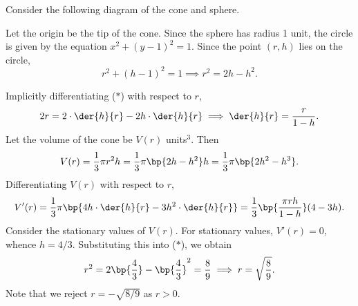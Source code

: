 \begin{solution}
    Consider the following diagram of the cone and sphere.

    \begin{center}
    \end{center}

    Let the origin be the tip of the cone. Since the sphere has radius 1 unit, the circle is given by the equation $x^2 + (y-1)^2 = 1$. Since the point $(r, h)$ lies on the circle, \[r^2 + (h-1)^2 = 1 \implies r^2 = 2h - h^2\tag{$\ast$}.\]

    \begin{ppart}
        Implicitly differentiating ($\ast$) with respect to $r$, \[2r = 2\cdot\der{h}{r} - 2h \cdot \der{h}{r} \implies \der{h}{r} = \frac{r}{1-h}.\] Let the volume of the cone be $V(r)$ units$^3$. Then \[V(r) = \frac13 \pi r^2 h = \frac13 \pi \bp{2h - h^2} h = \frac13 \pi \bp{2h^2 - h^3}.\] Differentiating $V(r)$ with respect to $r$, \[V'(r) = \frac13 \pi \bp{4h \cdot \der{h}{r} - 3h^2 \cdot \der{h}{r}} = \frac13 \bp{\frac{\pi rh}{1-h}} (4 - 3h).\] Consider the stationary values of $V(r)$. For stationary values, $V'(r) = 0$, whence $h = 4/3$. Substituting this into ($\ast$), we obtain \[r^2 = 2\bp{\frac43} - \bp{\frac43}^2 = \frac89 \implies r = \sqrt{\frac89}.\] Note that we reject $r = -\sqrt{8/9}$ as $r > 0$.


\end{ppart}
\end{solution}
